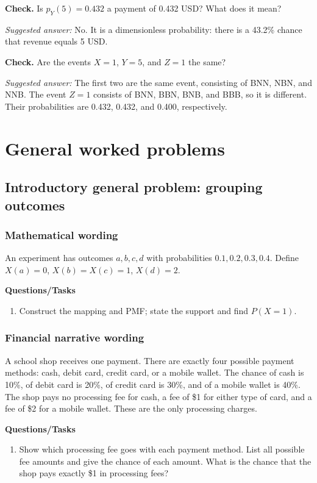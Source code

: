 \textbf{Check.} Is $p_Y(5)=0.432$ a payment of 0.432 USD? What does it mean?

\emph{Suggested answer:} No. It is a dimensionless probability: there is a 43.2\% chance that revenue equals 5 USD.

\textbf{Check.} Are the events $X=1$, $Y=5$, and $Z=1$ the same?

\emph{Suggested answer:} The first two are the same event, consisting of BNN, NBN, and NNB. The event $Z=1$ consists of BNN, BBN, BNB, and BBB, so it is different. Their probabilities are 0.432, 0.432, and 0.400, respectively.


\section{General worked problems}
\subsection{Introductory general problem: grouping outcomes}
\subsubsection*{Mathematical wording}
An experiment has outcomes $a,b,c,d$ with probabilities $0.1,0.2,0.3,0.4$. Define $X(a)=0$, $X(b)=X(c)=1$, $X(d)=2$.

\textbf{Questions/Tasks}
\begin{enumerate}
\item Construct the mapping and PMF; state the support and find $P(X=1)$.
\end{enumerate}
\subsubsection*{Financial narrative wording}
A school shop receives one payment. There are exactly four possible payment methods: cash, debit card, credit card, or a mobile wallet. The chance of cash is 10\%, of debit card is 20\%, of credit card is 30\%, and of a mobile wallet is 40\%. The shop pays no processing fee for cash, a fee of \$1 for either type of card, and a fee of \$2 for a mobile wallet. These are the only processing charges.

\textbf{Questions/Tasks}
\begin{enumerate}
\item Show which processing fee goes with each payment method. List all possible fee amounts and give the chance of each amount. What is the chance that the shop pays exactly \$1 in processing fees?
\end{enumerate}
